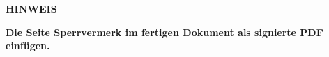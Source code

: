 \newpage
\setcounter{page}{2}

% 

% 





\thispagestyle{empty}
\begin{center}
\vspace*{5cm}
\textbf{\Huge HINWEIS}

\vspace{1cm}
\textbf{\Large Die Seite Sperrvermerk im fertigen Dokument als signierte PDF einfügen.}

\end{center}